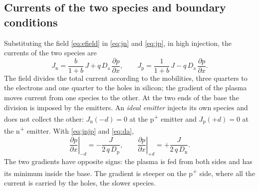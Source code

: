 \documentclass[10pt,a4paper]{scrartcl}
\newcommand{\Da}{D_\mathrm{a}}
\newcommand{\Dn}{D_\mathrm{n}}
\newcommand{\Dp}{D_\mathrm{p}}
\newcommand{\Jn}{J_\mathrm{n}}
\newcommand{\Jp}{J_\mathrm{p}}
\newcommand{\Pp}{p\textsuperscript{+}}
\newcommand{\Np}{n\textsuperscript{+}}
\newcommand{\dpar}[2]{\frac{\partial #1}{\partial #2}}
\begin{document}
\subsection{Currents of the two species and boundary conditions}
\label{sec:boundary}
Substituting the field \eqref{eq:efield} in \eqref{eq:jn} and \eqref{eq:jp}, in high injection, the currents of the two species are
\begin{equation}
\Jn = \frac{b}{1+b}\,J + q\,\Da\,\dpar{p}{x} , \qquad \Jp = \frac{1}{1+b}\,J - q\,\Da\,\dpar{p}{x} .
\label{eq:jnjp}
\end{equation}
The field divides the total current according to the mobilities, three quarters to the electrons and one quarter to the holes in silicon; the gradient of the plasma moves current from one species to the other. At the two ends of the base the division is imposed by the emitters. An \emph{ideal emitter} injects its own species and does not collect the other: $\Jn(-d) = 0$ at the \Pp{} emitter and $\Jp(+d) = 0$ at the \Np{} emitter. With \eqref{eq:jnjp} and \eqref{eq:da},
\begin{equation}
\left.\dpar{p}{x}\right|_{-d} = -\frac{J}{2\,q\,\Dp} , \qquad \left.\dpar{p}{x}\right|_{+d} = +\frac{J}{2\,q\,\Dn} .
\label{eq:bc}
\end{equation}
The two gradients have opposite signs: the plasma is fed from both sides and has its minimum inside the base. The gradient is steeper on the \Pp{} side, where all the current is carried by the holes, the slower species.
\end{document}
